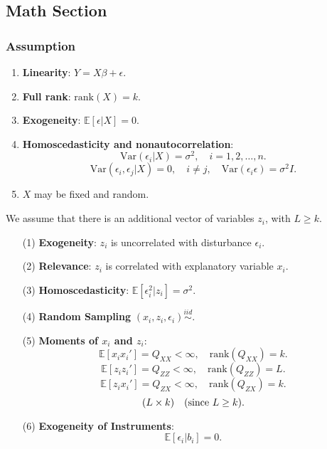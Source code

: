 \documentclass[12pt, oneside]{article}
\begin{document}
\subsection{Math Section}
\subsubsection{Assumption}

\begin{enumerate}
    \item \textbf{Linearity}: \( Y = X\beta + \epsilon \).
    \item \textbf{Full rank}: \( \text{rank}(X) = k \).
    \item \textbf{Exogeneity}: \( \mathbb{E}[\epsilon | X] = 0 \).
    
    \begin{center}
    \end{center}

    \item \textbf{Homoscedasticity and nonautocorrelation}:
    \[
    \text{Var}(\epsilon_i | X) = \sigma^2, \quad i = 1,2, \dots, n.
    \]
    \[
    \text{Var}(\epsilon_i, \epsilon_j | X) = 0, \quad i \neq j, \quad \text{Var}(\epsilon_i \epsilon) = \sigma^2 I.
    \]

    \item \( X \) may be fixed and random.
\end{enumerate}

We assume that there is an additional vector of variables \( z_i \), with \( L \geq k \).

\begin{enumerate}
    \item[(1)] \textbf{Exogeneity}: \( z_i \) is uncorrelated with disturbance \( \epsilon_i \).
    \item[(2)] \textbf{Relevance}: \( z_i \) is correlated with explanatory variable \( x_i \).
    \item[(3)] \textbf{Homoscedasticity}: \( \mathbb{E}[\epsilon_i^2 | z_i] = \sigma^2 \).
    \item[(4)] \textbf{Random Sampling} \((x_i, z_i, \epsilon_i) \overset{iid}{\sim} \).
    \item[(5)] \textbf{Moments of \( x_i \) and \( z_i \)}:
    \[
    \mathbb{E}[x_i x_i'] = Q_{XX} < \infty, \quad \text{rank}(Q_{XX}) = k.
    \]
    \[
    \mathbb{E}[z_i z_i'] = Q_{ZZ} < \infty, \quad \text{rank}(Q_{ZZ}) = L.
    \]
    \[
    \mathbb{E}[z_i x_i'] = Q_{ZX} < \infty, \quad \text{rank}(Q_{ZX}) = k.
    \]
    \[
    (L \times k) \quad \text{(since \( L \geq k \))}.
    \]
    \item[(6)] \textbf{Exogeneity of Instruments}:
    \[
    \mathbb{E}[\epsilon_i | b_i] = 0.
    \]
\end{enumerate}
\end{document}
